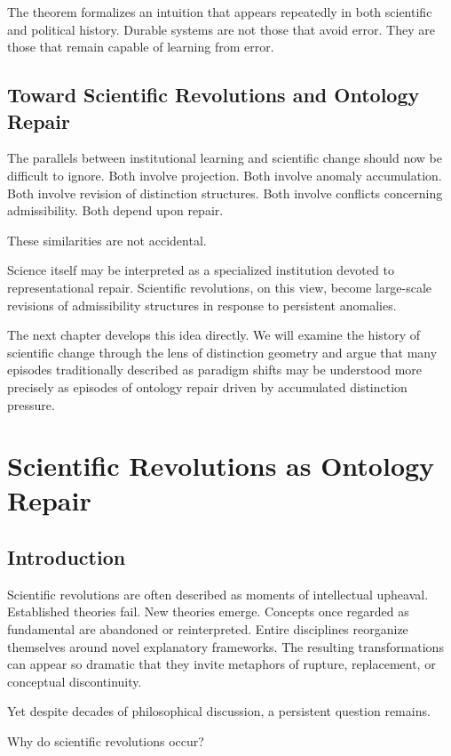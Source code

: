\documentclass[11pt,oneside,openany]{book}
\begin{document}
The theorem formalizes an intuition that appears repeatedly in both scientific and political history. Durable systems are not those that avoid error. They are those that remain capable of learning from error.

\section{Toward Scientific Revolutions and Ontology Repair}

The parallels between institutional learning and scientific change should now be difficult to ignore. Both involve projection. Both involve anomaly accumulation. Both involve revision of distinction structures. Both involve conflicts concerning admissibility. Both depend upon repair.

These similarities are not accidental.

Science itself may be interpreted as a specialized institution devoted to representational repair. Scientific revolutions, on this view, become large-scale revisions of admissibility structures in response to persistent anomalies.

The next chapter develops this idea directly. We will examine the history of scientific change through the lens of distinction geometry and argue that many episodes traditionally described as paradigm shifts may be understood more precisely as episodes of ontology repair driven by accumulated distinction pressure.

\chapter{Scientific Revolutions as Ontology Repair}

\section{Introduction}

Scientific revolutions are often described as moments of intellectual upheaval. Established theories fail. New theories emerge. Concepts once regarded as fundamental are abandoned or reinterpreted. Entire disciplines reorganize themselves around novel explanatory frameworks. The resulting transformations can appear so dramatic that they invite metaphors of rupture, replacement, or conceptual discontinuity.

Yet despite decades of philosophical discussion, a persistent question remains.

Why do scientific revolutions occur?
\end{document}
